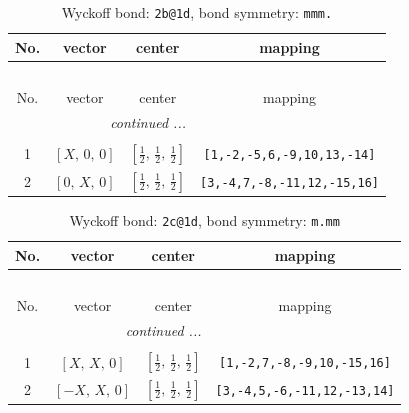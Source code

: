 \documentclass[fleqn,8pt]{jsarticle}
\begin{document}
\renewcommand{\arraystretch}{1.2}
\begin{longtable}{cccc}
\caption{Wyckoff bond: {\tt 2b@1d}, bond symmetry: {\tt mmm.}}
 \\
 \hline \hline
No. & vector & center & mapping \\ \hline \endfirsthead

\multicolumn{3}{l}{\tablename\ \thetable{}} \\
 \hline \hline
No. & vector & center & mapping \\ \hline \endhead

 \hline \hline
\multicolumn{3}{r}{\footnotesize\it continued ...} \\ \endfoot

 \hline \hline
\multicolumn{3}{r}{} \\ \endlastfoot

1 & $\left[ X,\, 0,\, 0 \right]$ & $\left[ \frac{1}{2},\, \frac{1}{2},\, \frac{1}{2} \right]$ & {\tt [1,-2,-5,6,-9,10,13,-14]} \\ \hline
2 & $\left[ 0,\, X,\, 0 \right]$ & $\left[ \frac{1}{2},\, \frac{1}{2},\, \frac{1}{2} \right]$ & {\tt [3,-4,7,-8,-11,12,-15,16]} \\
\end{longtable}
\renewcommand{\arraystretch}{1.2}
\begin{longtable}{cccc}
\caption{Wyckoff bond: {\tt 2c@1d}, bond symmetry: {\tt m.mm}}
 \\
 \hline \hline
No. & vector & center & mapping \\ \hline \endfirsthead

\multicolumn{3}{l}{\tablename\ \thetable{}} \\
 \hline \hline
No. & vector & center & mapping \\ \hline \endhead

 \hline \hline
\multicolumn{3}{r}{\footnotesize\it continued ...} \\ \endfoot

 \hline \hline
\multicolumn{3}{r}{} \\ \endlastfoot

1 & $\left[ X,\, X,\, 0 \right]$ & $\left[ \frac{1}{2},\, \frac{1}{2},\, \frac{1}{2} \right]$ & {\tt [1,-2,7,-8,-9,10,-15,16]} \\ \hline
2 & $\left[ - X,\, X,\, 0 \right]$ & $\left[ \frac{1}{2},\, \frac{1}{2},\, \frac{1}{2} \right]$ & {\tt [3,-4,5,-6,-11,12,-13,14]} \\
\end{longtable}
\renewcommand{\arraystretch}{1.2}
\end{document}
